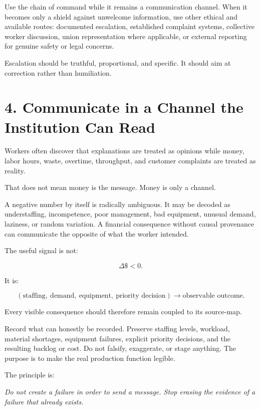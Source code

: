 \documentclass[11pt,oneside]{article}
\renewenvironment{quote}
  {\begin{tcolorbox}[
      enhanced,
      breakable,
      colback=ManifestLight,
      colframe=ManifestRule,
      boxrule=0pt,
      leftrule=3pt,
      arc=0pt,
      outer arc=0pt,
      left=10pt,right=10pt,top=8pt,bottom=8pt,
      before skip=0.8em,after skip=0.8em
    ]\itshape}
  {\end{tcolorbox}}
\begin{document}
Use the chain of command while it remains a communication channel. When
it becomes only a shield against unwelcome information, use other
ethical and available routes: documented escalation, established
complaint systems, collective worker discussion, union representation
where applicable, or external reporting for genuine safety or legal
concerns.

Escalation should be truthful, proportional, and specific. It should aim
at correction rather than humiliation.

\section{4. Communicate in a Channel the Institution Can
Read}\label{communicate-in-a-channel-the-institution-can-read}

Workers often discover that explanations are treated as opinions while
money, labor hours, waste, overtime, throughput, and customer complaints
are treated as reality.

That does not mean money is the message. Money is only a channel.

A negative number by itself is radically ambiguous. It may be decoded as
understaffing, incompetence, poor management, bad equipment, unusual
demand, laziness, or random variation. A financial consequence without
causal provenance can communicate the opposite of what the worker
intended.

The useful signal is not:

\[
\Delta \$ < 0.
\]

It is:

\[
(\text{staffing},\ \text{demand},\ \text{equipment},\ \text{priority decision})
\longrightarrow
\text{observable outcome}.
\]

Every visible consequence should therefore remain coupled to its
source-map.

Record what can honestly be recorded. Preserve staffing levels,
workload, material shortages, equipment failures, explicit priority
decisions, and the resulting backlog or cost. Do not falsify,
exaggerate, or stage anything. The purpose is to make the real
production function legible.

The principle is:

\begin{quote}
Do not create a failure in order to send a message. Stop erasing the
evidence of a failure that already exists.
\end{quote}
\end{document}
